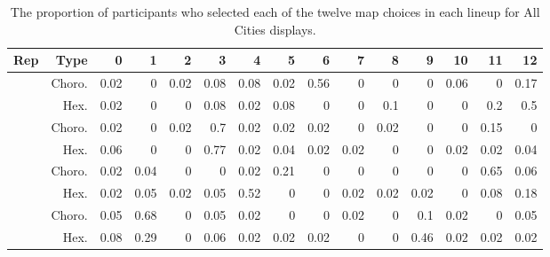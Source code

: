 \documentclass{monashthesis}
\begin{document}
\begin{Shaded}
\end{Shaded}

\begin{table}

\caption{\label{tab:choice-all}The proportion of participants who selected each of the twelve map choices in each lineup for All Cities displays.}
\centering
\begin{tabular}[t]{r|r|r|r|r|r|r|r|r|r|r|r|r|r|r}
\hline
Rep & Type & 0 & 1 & 2 & 3 & 4 & 5 & 6 & 7 & 8 & 9 & 10 & 11 & 12\\
\hline
 & Choro. & 0.02 & 0 & 0.02 & 0.08 & 0.08 & 0.02 & 0.56 & 0 & 0 & 0 & 0.06 & 0 & 0.17\\
\cline{2-15}
\multirow{-2}{*}{\raggedleft\arraybackslash 1} & Hex. & 0.02 & 0 & 0 & 0.08 & 0.02 & 0.08 & 0 & 0 & 0.1 & 0 & 0 & 0.2 & 0.5\\
\cline{1-15}
 & Choro. & 0.02 & 0 & 0.02 & 0.7 & 0.02 & 0.02 & 0.02 & 0 & 0.02 & 0 & 0 & 0.15 & 0\\
\cline{2-15}
\multirow{-2}{*}{\raggedleft\arraybackslash 2} & Hex. & 0.06 & 0 & 0 & 0.77 & 0.02 & 0.04 & 0.02 & 0.02 & 0 & 0 & 0.02 & 0.02 & 0.04\\
\cline{1-15}
 & Choro. & 0.02 & 0.04 & 0 & 0 & 0.02 & 0.21 & 0 & 0 & 0 & 0 & 0 & 0.65 & 0.06\\
\cline{2-15}
\multirow{-2}{*}{\raggedleft\arraybackslash 3} & Hex. & 0.02 & 0.05 & 0.02 & 0.05 & 0.52 & 0 & 0 & 0.02 & 0.02 & 0.02 & 0 & 0.08 & 0.18\\
\cline{1-15}
 & Choro. & 0.05 & 0.68 & 0 & 0.05 & 0.02 & 0 & 0 & 0.02 & 0 & 0.1 & 0.02 & 0 & 0.05\\
\cline{2-15}
\multirow{-2}{*}{\raggedleft\arraybackslash 4} & Hex. & 0.08 & 0.29 & 0 & 0.06 & 0.02 & 0.02 & 0.02 & 0 & 0 & 0.46 & 0.02 & 0.02 & 0.02\\
\hline
\end{tabular}
\end{table}
\end{document}
